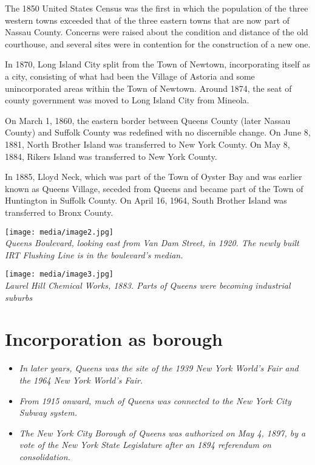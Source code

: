The 1850 United States Census was the first in which the population of
the three western towns exceeded that of the three eastern towns that
are now part of Nassau County. Concerns were raised about the condition
and distance of the old courthouse, and several sites were in contention
for the construction of a new one.

In 1870, Long Island City split from the Town of Newtown, incorporating
itself as a city, consisting of what had been the Village of Astoria and
some unincorporated areas within the Town of Newtown. Around 1874, the
seat of county government was moved to Long Island City from Mineola.

On March 1, 1860, the eastern border between Queens County (later Nassau
County) and Suffolk County was redefined with no discernible change. On
June 8, 1881, North Brother Island was transferred to New York County.
On May 8, 1884, Rikers Island was transferred to New York County.

In 1885, Lloyd Neck, which was part of the Town of Oyster Bay and was
earlier known as Queens Village, seceded from Queens and became part of
the Town of Huntington in Suffolk County. On April 16, 1964, South
Brother Island was transferred to Bronx County.

\texttt{[image: media/image2.jpg]}\\
\emph{Queens Boulevard, looking east from Van Dam Street, in 1920. The
newly built IRT Flushing Line is in the boulevard's median.}

\texttt{[image: media/image3.jpg]}\\
\emph{Laurel Hill Chemical Works, 1883. Parts of Queens were becoming
industrial suburbs}

\section{Incorporation as borough}\label{incorporation-as-borough}

\begin{itemize}
\item
  \emph{In later years, Queens was the site of the 1939 New York World's
  Fair and the 1964 New York World's Fair.}
\item
  \emph{From 1915 onward, much of Queens was connected to the New York
  City Subway system.}
\item
  \emph{The New York City Borough of Queens was authorized on May 4,
  1897, by a vote of the New York State Legislature after an 1894
  referendum on consolidation.}
\end{itemize}

